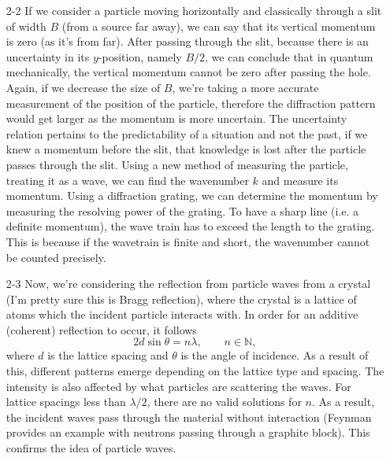 \documentclass{homework}
\begin{document}
\begin{enumerate}
		
		\item[2-2] If we consider a particle moving horizontally and classically through a slit of width $B$ (from a source far away), we can say that its vertical momentum is zero (as it's from far). After passing through the slit, because there is an uncertainty in its $y$-position, namely $B/2$, we can conclude that in quantum mechanically, the vertical momentum cannot be zero after passing the hole. Again, if we decrease the size of $B$, we're taking a more accurate measurement of the position of the particle, therefore the diffraction pattern would get larger as the momentum is more uncertain. The uncertainty relation pertains to the predictability of a situation and not the past, if we knew a momentum before the slit, that knowledge is lost after the particle passes through the slit. Using a new method of measuring the particle, treating it as a wave, we can find the wavenumber $k$ and measure its momentum. Using a diffraction grating, we can determine the momentum by measuring the resolving power of the grating. To have a sharp line (i.e. a definite momentum), the wave train has to exceed the length to the grating. This is because if the wavetrain is finite and short, the wavenumber cannot be counted precisely. 
		
		\item[2-3] Now, we're considering the reflection from particle waves from a crystal (I'm pretty sure this is Bragg reflection), where the crystal is a lattice of atoms which the incident particle interacts with. In order for an additive (coherent) reflection to occur, it follows $$2d \sin \theta = n \lambda, \qquad n \in \mathbb{N},$$
		where $d$ is the lattice spacing and $\theta$ is the angle of incidence. As a result of this, different patterns emerge depending on the lattice type and spacing. The intensity is also affected by what particles are scattering the waves. For lattice spacings less than $\lambda / 2$, there are no valid solutions for $n$. As a result, the incident waves pass through the material without interaction (Feynman provides an example with neutrons passing through a graphite block). This confirms the idea of particle waves.
		

\end{enumerate}
\end{document}
